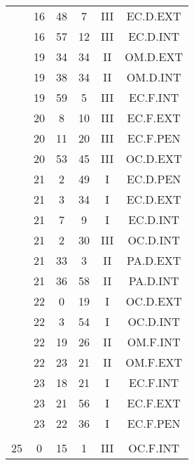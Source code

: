 \documentclass[12pt, a4paper]{article}
\begin{document}
\begin{multicols}{3}
{\begin{tabular}{c c c c c c}
	 	 	 	 & 16 & 48 & 7 & III & EC.D.EXT\\%
	 	 	 	 & 16 & 57 & 12 & III & EC.D.INT\\%
	 	 	 	 & 19 & 34 & 34 & II & OM.D.EXT\\%
	 	 	 	 & 19 & 38 & 34 & II & OM.D.INT\\%
	 	 	 	 & 19 & 59 & 5 & III & EC.F.INT\\%
	 	 	 	 & 20 & 8 & 10 & III & EC.F.EXT\\%
	 	 	 	 & 20 & 11 & 20 & III & EC.F.PEN\\%
	 	 	 	 & 20 & 53 & 45 & III & OC.D.EXT\\%
	 	 	 	 & 21 & 2 & 49 & I & EC.D.PEN\\%
	 	 	 	 & 21 & 3 & 34 & I & EC.D.EXT\\%
	 	 	 	 & 21 & 7 & 9 & I & EC.D.INT\\%
	 	 	 	 & 21 & 2 & 30 & III & OC.D.INT\\%
	 	 	 	 & 21 & 33 & 3 & II & PA.D.EXT\\%
	 	 	 	 & 21 & 36 & 58 & II & PA.D.INT\\%
	 	 	 	 & 22 & 0 & 19 & I & OC.D.EXT\\%
	 	 	 	 & 22 & 3 & 54 & I & OC.D.INT\\%
	 	 	 	 & 22 & 19 & 26 & II & OM.F.INT\\%
	 	 	 	 & 22 & 23 & 21 & II & OM.F.EXT\\%
	 	 	 	 & 23 & 18 & 21 & I & EC.F.INT\\%
	 	 	 	 & 23 & 21 & 56 & I & EC.F.EXT\\%
	 	 	 	 & 23 & 22 & 36 & I & EC.F.PEN\\%
	 	 	 	 & & & & & \\%
	 	 	 	25 & 0 & 15 & 1 & III & OC.F.INT\\%

\end{tabular}}
\end{multicols}
\end{document}
